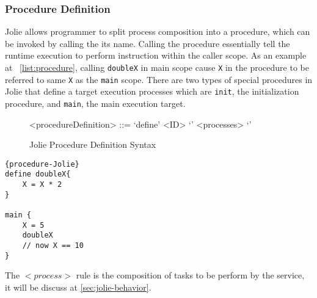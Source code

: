 \subsubsection{Procedure Definition}
\label{sec:jolie-procedure-def}

Jolie allows programmer to split process composition into a procedure, which can be invoked by calling the its name. Calling the procedure essentially tell the runtime execution to perform instruction within the caller scope. As an example at ~\ref{list:procedure}, calling \texttt{doubleX} in main scope cause \texttt{X} in the procedure to be referred to same \texttt{X} as the \texttt{main} scope. There are two types of special procedures in Jolie that define a target execution processes which are \texttt{init}, the initialization procedure, and \texttt{main}, the main execution target.

\begin{figure}[h]
	\begin{framed}
		\begin{grammar}
			<procedureDefinition> ::= `define' <ID> `{' <processes> `}'
		\end{grammar}
	\end{framed}
	\caption{Jolie Procedure Definition Syntax}
\end{figure}


\begin{listing}[h]
\lstset{language=Jolie,
	style=codeStyle
}
\begin{lstlisting}[frame=tlrb, caption= {Jolie procedure example}, label={list:procedure}]{procedure-Jolie}
define doubleX{
	X = X * 2
}

main {
	X = 5
	doubleX
	// now X == 10
}
\end{lstlisting}
\end{listing}

The \(<process>\) rule is the composition of tasks to be perform by the service, it will be discuss at \autoref{sec:jolie-behavior}.

\FloatBarrier
